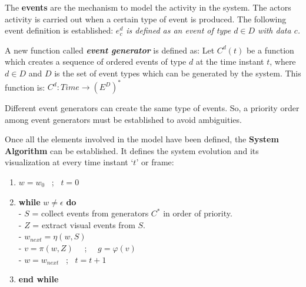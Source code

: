 \documentclass{svmult}
\begin{document}

The \textbf{events} are the mechanism to model the activity in the system. The actors activity is carried out when a certain type of event is produced. The following event definition is established: {\itshape $e_c^d$ is defined as an event of type $d \in D$ with data $c$. }

A new function called \textbf{\textit{event generator}} is defined as:  Let $C^d(t)$ be a function
which creates a sequence of ordered events of type $d$ at the time instant $t$, where $d \in D$ and
$D$ is the set of event types which can be generated by the system. This function is:
$C^d: Time \rightarrow (E^D)^*$

Different event generators can create the same type of events. So, a priority
order among event generators must be established to avoid ambiguities.



Once all the elements involved in the model have been defined, the \textbf{System Algorithm} can be established. It defines the system evolution and its visualization at every
time instant `$t$' or frame:


\begin{enumerate}
	\item $w = w_0$ \ ; \ $t = 0$
	\item \textbf{while} $w \neq \epsilon$ \textbf{do}
		\\
		- $S$ = collect events from generators $C^*$ in
			   order of priority.
		\\   
		- $Z$ = extract visual events from $S$.
		\\
		- $w_{next} = \eta(w, S)$
		\\
		- $v =  \pi(w, Z)$ \ \ ; \ \ $g = \varphi(v)$
		\\
		- $w = w_{next}$ \ ; \ $t = t + 1$
    \item \textbf{end while}
\end{enumerate}
\end{document}
